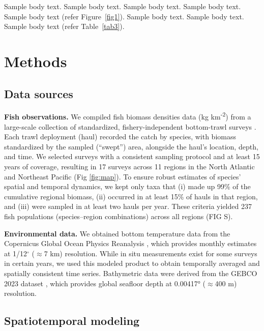 \documentclass[lineno,pdflatex,sn-nature]{sn-jnl}%
\begin{document}
Sample body text. Sample body text. Sample body text. Sample body text. Sample body text (refer Figure~\ref{fig1}). Sample body text. Sample body text. Sample body text (refer Table~\ref{tab3}). 

\section{Methods}\label{methods}

\subsection{Data sources}

\textbf{Fish observations.} We compiled fish biomass densities data (kg km\textsuperscript{-2}) from 
a large-scale collection of standardized, fishery-independent bottom-trawl surveys \citep{maureaud_fishglob_data_2024}. Each trawl deployment (haul) recorded the catch by species, with biomass standardized by the sampled (``swept'') area, alongside the haul’s location, depth, and time. We selected surveys with a consistent sampling protocol and at least 15 years of coverage, resulting in 17 surveys across 11 regions in the North Atlantic and Northeast Pacific (Fig \ref{fig:map}).
To ensure robust estimates of species’ spatial and temporal dynamics, we kept only taxa that (i) made up 99\% of the cumulative regional biomass, (ii) occurred in at least 15\% of hauls in that region, and (iii) were sampled in at least two hauls per year. These criteria yielded 237 fish populations (species–region combinations) across all regions (FIG S).

\textbf{Environmental data.} We obtained bottom temperature data from the Copernicus Global Ocean Physics Reanalysis \citep{european_union-copernicus_marine_service_global_2018}, which provides monthly estimates at 1/12$^{\circ}$ ($\approx$7 km) resolution. While in situ measurements exist for some surveys in certain years, we used this modeled product to obtain temporally averaged and spatially consistent time series. Bathymetric data were derived from the GEBCO 2023 dataset \citep{gebco_bathymetric_compilation_group_2023_gebco_2023_2023}, which provides global seafloor depth at 0.00417° ($\approx$400 m) resolution.



\subsection{Spatiotemporal modeling}\label{sec:Species spatiotemporal modeling}
\end{document}
